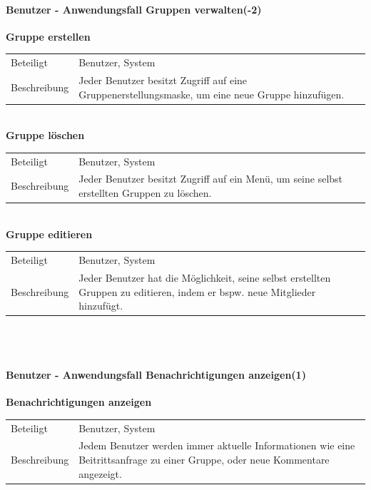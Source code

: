 \documentclass[12pt,a4paper]{article}
\begin{document}
\paragraph{Benutzer - Anwendungsfall \glqq Gruppen verwalten\grqq (-2)}\mbox{}

\textbf{Gruppe erstellen}\\
\begin{tabular}{l|p{12cm}}
	\hline 
	Beteiligt & Benutzer, System \\ 
	Beschreibung & Jeder Benutzer besitzt Zugriff auf eine Gruppenerstellungsmaske, um eine neue Gruppe hinzufügen. \\ 
\end{tabular}\\

\textbf{Gruppe löschen}\\
\begin{tabular}{l|p{12cm}}
	\hline 
	Beteiligt & Benutzer, System \\ 
	Beschreibung & Jeder Benutzer besitzt Zugriff auf ein Menü, um seine selbst erstellten Gruppen zu löschen. \\ 
\end{tabular}\\

\textbf{Gruppe editieren}\\
\begin{tabular}{l|p{12cm}}
	\hline 
	Beteiligt & Benutzer, System \\ 
	Beschreibung & Jeder Benutzer hat die Möglichkeit, seine selbst erstellten Gruppen zu editieren, indem er bspw. neue Mitglieder hinzufügt. \\ 
\end{tabular}\\\\


\paragraph{Benutzer - Anwendungsfall \glqq Benachrichtigungen anzeigen\grqq  (1)}\mbox{}

\textbf{Benachrichtigungen anzeigen}\\
\begin{tabular}{l|p{12cm}}
	\hline 
	Beteiligt & Benutzer, System \\ 
	Beschreibung & Jedem Benutzer werden immer aktuelle Informationen wie eine Beitrittsanfrage zu einer Gruppe, oder neue Kommentare angezeigt. \\ 
\end{tabular}\\\\
\end{document}
